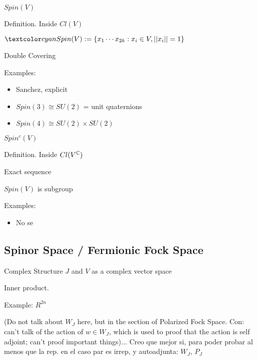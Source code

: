 \begin{frame}{$Spin(V)$} %

    Definition. Inside $Cl(V)$
    \begin{Definition} $\defn{\spinv} := \set{x_1 \cdots x_{2k}: x_i \in V, ||x_i|| = 1}$
    \end{Definition}
    
    Double Covering
    
    Examples:
        \begin{itemize}
            
        \item Sanchez, explicit
        
        \item $Spin(3) \cong SU(2)$ = {unit quaternions}
        
        \item $Spin(4) \cong SU(2) \times SU(2)$
            
        \end{itemize}
\end{frame}

\begin{frame}{$Spin^c(V)$} %

    Definition. Inside $Cl(V^\mathbb C)$
    
    Exact sequence
    
    $Spin(V)$ is subgroup
    
    Examples:
        \begin{itemize}
            
        \item No se
            
        \end{itemize}

\end{frame}

\subsection{Spinor Space / Fermionic Fock Space}

\begin{frame}{Complex Structure $J$ and $V$ as a complex vector space} %

    Inner product.
    
    Example: $R^{2n}$
    
    (Do not talk about $W_J$ here, but in the section of Polarized Fock Space. Con: can't talk of the action of $w \in W_J$, which is used to proof that the action is self adjoint; can't proof important things)... Creo que mejor si, para poder probar al menos que la rep. en el caso par es irrep, y autoadjunta: $W_J$, $P_J$ 

\end{frame}
